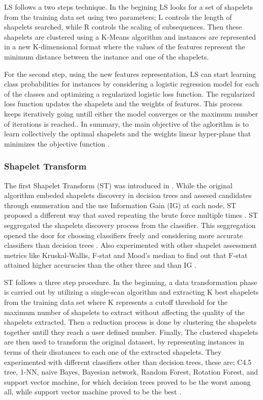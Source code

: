 LS follows a two steps technique. In the begining LS looks for a set of shapelets from the training data set using two parameters;
L controls the length of shapelets searched, while R controls the scaling of subsequences. Then these shapelets are clustered using
a K-Means algorithm and instances are represented in a new K-dimensional format where the values of the features represent the minimum
distance between the instance and one of the shapelets.

For the second step, using the new features representation, LS can start learning class probabilities for instances by considering a logistic regression model for each
of the classes and optimizing a regularized logistic loss function. The regularized loss function updates the shapelets and the weights of features.
This process keeps iteratively going untill either the model converges or the maximum number of iterations is reached.\cite{bostrom2018shapelet}.
In summary, the main objective of the aglorithm is to learn collectively the optimal shapelets and the weights
linear hyper-plane that minimizes the objective function \cite{bagnall2017great,grabocka2014learning}.

\subsubsection{Shapelet Transform}
\label{SubsubsectionST}
The first Shapelet Transform (ST) was introduced in \cite{hills2014classification}.
While the original algorithm embeded shapelets discovery in decision trees and assesed candidates through enumeration and 
the use Information Gain (IG) at each node, ST proposed a different way that saved repeating the brute force multiple times \cite{bostrom2018shapelet}.
ST seggregated the shapelets discovery process from the classifier. This seggregation opened the door for choosing classifiers freely and considering more accurate
classifiers than decision trees \cite{bagnall2017great,lines2015time}. Also \cite{hills2014classification} experimented with other shapelet assessment metrics like Kruskal-Wallis, F-stat and Mood’s median
to find out that F-stat attained higher accuracies than the other three and than IG \cite{bostrom2018shapelet}.

ST follows a three step procedure. In the beginning, a data transformation phase is carried out by utilizing a single-scan algorithm and extracting K best shapelets from the training
data set where K represents a cutoff threshold for the maximum number of shapelets to extract without affecting the quality of the shapelets extracted.
Then a reduction process is done by clustering the shapelets together untill they reach a user defined number.
Finally, The clustered shapelets are then used to transform the original datasest, by representing instances in terms of their disatances to each one of the extracted shapelets.
They experimented with different classifiers other than decision trees, these are; C4.5 tree, 1-NN, naive Bayes, Bayesian network, Random Forest, Rotation Forest, and support vector machine,
for which decision trees proved to be the worst among all, while support vector machine proved to be the best \cite{hills2014classification}.

